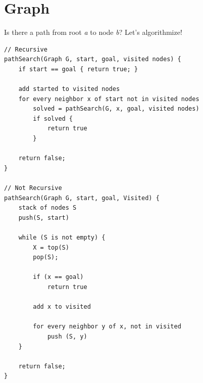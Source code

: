 \documentclass{article}
\begin{document}
\section{Graph}
Is there a path from root \textit{a} to node \textit{b}? Let's algorithmize!

\begin{verbatim}
// Recursive
pathSearch(Graph G, start, goal, visited nodes) {
    if start == goal { return true; }

    add started to visited nodes
    for every neighbor x of start not in visited nodes
        solved = pathSearch(G, x, goal, visited nodes)
        if solved {
            return true
        }

    return false;
}

// Not Recursive
pathSearch(Graph G, start, goal, Visited) {
    stack of nodes S
    push(S, start)

    while (S is not empty) {
        X = top(S)
        pop(S);

        if (x == goal)
            return true

        add x to visited

        for every neighbor y of x, not in visited
            push (S, y)
    }

    return false;
}
\end{verbatim}
\end{document}
